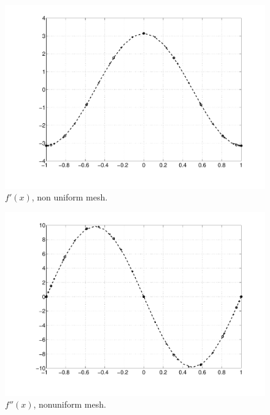 \begin{landscape}
\begin{multicols}{3}
\columnbreak

\begin{figure}[H]
\centering
\includegraphics[scale=0.3, trim = 20mm 0mm 0mm 0mm, clip]{./Figures/1-HOFD/du_nonu.pdf}
\caption{$f'(x)$, non uniform mesh. }
\end{figure}

\columnbreak

\begin{figure}[H]
\centering
\includegraphics[scale=0.3, trim = 20mm 0mm 0mm 0mm, clip]{./Figures/1-HOFD/ddu_nonu.pdf}
\caption{$f''(x)$, nonuniform mesh. }
\end{figure}

\end{multicols}
\end{landscape}
\newpage

